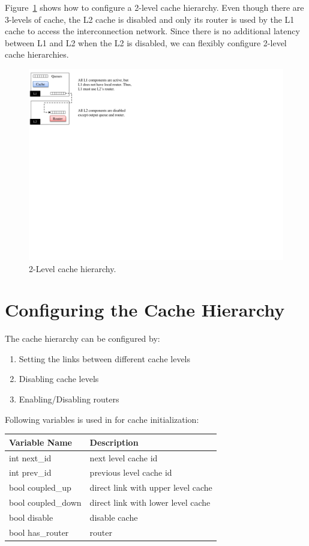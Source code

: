 Figure~\ref{fig:level2cache} shows how to configure a 2-level cache hierarchy.
Even though there are 3-levels of cache, the L2 cache is disabled and only its
router is used by the L1 cache to access the interconnection network. Since
there is no additional latency between L1 and L2 when the L2 is disabled, we
can flexibly configure 2-level cache hierarchies.


\begin{figure}[htb]
\centering
\includegraphics{figs/level2cache}
\caption{2-Level cache hierarchy.}
\label{fig:level2cache}
\end{figure}

\section{Configuring the Cache Hierarchy} 

The cache hierarchy can be configured by:
\begin{enumerate}
 \item Setting the links between different cache levels
 \item Disabling cache levels
 \item Enabling/Disabling routers
\end{enumerate}
Following variables is used in \SIM for cache initialization:

\begin{center}
\begin{tabular}{l | l}
  Variable Name & Description \\ \hline \hline
  int next\_id & next level cache id \\
  int prev\_id & previous level cache id \\ 
  bool coupled\_up &  direct link with upper level cache \\
  bool coupled\_down & direct link with lower level cache \\
  bool disable & disable cache \\
  bool has\_router & router \\ 
\end{tabular}
\end{center}

